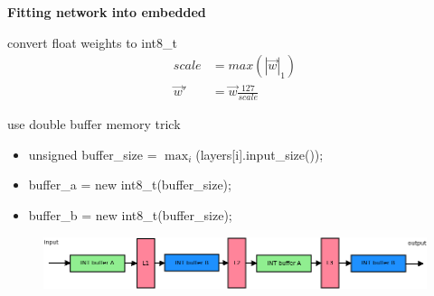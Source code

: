 \documentclass[xcolor=dvipsnames]{beamer}
\begin{document}
\begin{frame}{\bf Fitting network into embedded}

convert float weights to int8\_t
\begin{align*}
  scale &= max{(|\vec{w}|_1)} \\
  \vec{w}' &= \vec{w}\frac{127}{scale}
\end{align*}


use double buffer memory trick

\begin{itemize}
  \item unsigned buffer\_size = $\max_{i}$(layers[i].input\_size());
  \item buffer\_a = new int8\_t(buffer\_size);
  \item buffer\_b = new int8\_t(buffer\_size);
\end{itemize}

\begin{figure}
  \includegraphics[scale=0.3]{../../diagrams/nn_memory.png}
\end{figure}

\end{frame}
\end{document}
